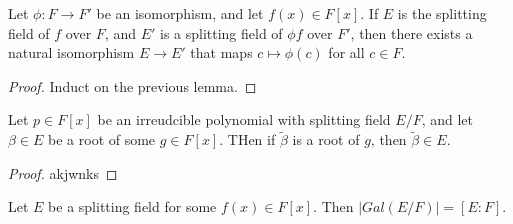 \begin{theorem}\label{thm:1}
	Let $\phi : F \to F'$ be an isomorphism, and let $f(x)\in F[x]$. If $E$ is the splitting field of $f$ over $F$, and $E'$ is a splitting field of $\phi f$ over $F'$, then there exists a natural isomorphism $E\to E'$ that maps $c\mapsto \phi (c)$ for all $c\in F$.
\end{theorem}
\begin{proof}
	Induct on the previous lemma.
\end{proof}

\begin{theorem}\label{thm:ksjdn}
	Let $p\in F[x]$ be an irreudcible polynomial with splitting field $E/F$, and let $\beta \in E$ be a root of some $g\in F[x]$. THen if $\widetilde{\beta} $ is a root of $g$, then $\widetilde{\beta } \in E$.
\end{theorem}
\begin{proof}
	akjwnks
\end{proof}

\begin{theorem}[huge]\label{thm:kjsdb}
	Let $E$ be a splitting field for some $f(x)\in F[x]$. Then $\left| Gal(E/F) \right| =\left[ E:F \right] $.
\end{theorem}

